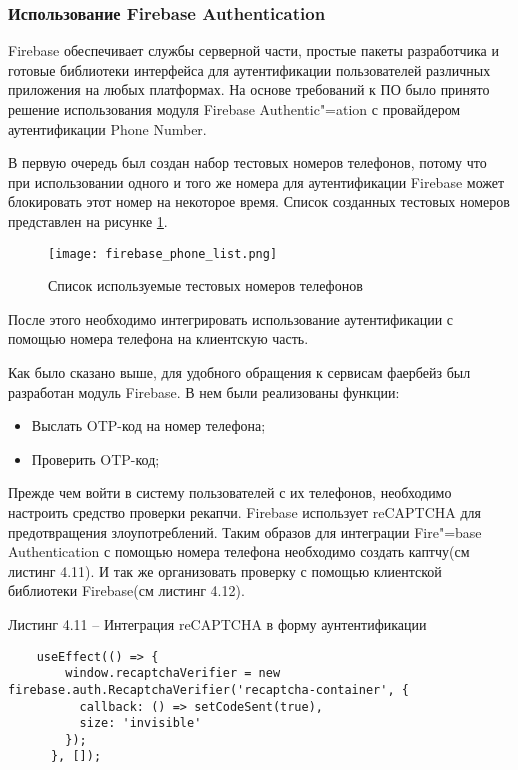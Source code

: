 \subsubsection{Использование Firebase Authentication}\hfill

Firebase обеспечивает службы серверной части, простые пакеты разработчика и готовые библиотеки интерфейса для аутентификации пользователей различных приложения на любых платформах.
На основе требований к ПО было принято решение использования модуля Firebase Authentic"=ation с провайдером аутентификации Phone Number.

В первую очередь был создан набор тестовых номеров телефонов, потому что при использовании одного и того же номера для аутентификации Firebase может блокировать этот номер на некоторое время.
Список созданных тестовых номеров представлен на рисунке \ref{fire:phones}.
\begin{figure}[ht]
    \centering
    \texttt{[image: firebase\_phone\_list.png]}
    \caption{ Список используемые тестовых номеров телефонов }
    \label{fire:phones}
\end{figure}

После этого необходимо интегрировать использование аутентификации с помощью номера телефона на клиентскую часть.

Как было сказано выше, для удобного обращения к сервисам фаербейз был разработан модуль Firebase.
В нем были реализованы функции:
\begin{itemize}
    \item Выслать OTP-код на номер телефона;
    \item Проверить OTP-код;
\end{itemize}

Прежде чем войти в систему пользователей с их телефонов, необходимо настроить средство проверки рекапчи.
Firebase использует reCAPTCHA для предотвращения злоупотреблений.
Таким образов для интеграции Fire"=base Authentication с помощью номера телефона необходимо создать каптчу(см листинг 4.11).
И так же организовать проверку с помощью клиентской библиотеки Firebase(см листинг 4.12).

\pagebreak

Листинг 4.11 – Интеграция reCAPTCHA в форму аунтентификации
\begin{lstlisting}
    useEffect(() => {
        window.recaptchaVerifier = new firebase.auth.RecaptchaVerifier('recaptcha-container', {
          callback: () => setCodeSent(true),
          size: 'invisible'
        });
      }, []);
\end{lstlisting}


